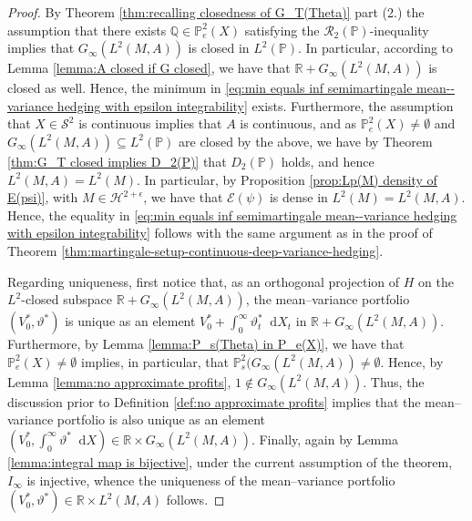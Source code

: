 \documentclass[11pt,a4paper,twoside,openany]{report}
\numberwithin{equation}{section}
\newcommand{\diff}{\mathop{}\!\mathrm{d}}
\theoremstyle{plain} %
\theoremstyle{definition} %
\theoremstyle{remark} %
\begin{document}
\begin{proof}
   By Theorem \ref{thm:recalling closedness of G_T(Theta)} part (2.) the assumption that there exists \(\mathbb{Q}\in\mathbb{P}_e^2(X)\) satisfying the \(\mathcal{R}_2(\mathbb{P})\)-inequality implies that \(G_{\infty}(L^2(M,A))\) is closed in \(L^2(\mathbb{P})\). In particular, according to Lemma \ref{lemma:A closed if G closed}, we have that \(\mathbb{R}+G_{\infty}(L^2(M,A))\) is closed as well. Hence, the minimum in \eqref{eq:min equals inf semimartingale mean--variance hedging with epsilon integrability} exists. 
  Furthermore, the assumption that \(X\in \mathcal{S}^2\) is continuous implies that \(A\) is continuous, and as \(\mathbb{P}_e^2(X)\neq\emptyset\) and \(G_{\infty}(L^2(M,A))\subseteq L^2(\mathbb{P})\) are closed by the above, we have by Theorem \ref{thm:G_T closed implies D_2(P)} that \(D_2(\mathbb{P})\) holds, and hence \(L^2(M,A) = L^2(M)\). In particular, by Proposition \ref{prop:Lp(M) density of E(psi)}, with \(M\in\mathcal{H}^{2+\epsilon}\), we have that \(\mathcal{E}(\psi)\) is dense in \(L^2(M)=L^2(M,A)\). Hence, the equality in \eqref{eq:min equals inf semimartingale mean--variance hedging with epsilon integrability} follows with the same argument as in the proof of Theorem \ref{thm:martingale-setup-continuous-deep-variance-hedging}.

   Regarding uniqueness, first notice that, as an orthogonal projection of \(H\) on the \(L^2\)-closed subspace \(\mathbb{R}+G_{\infty}(L^2(M,A))\), the mean--variance portfolio \((V_0^*,\vartheta^*)\) is unique as an element \(V_0^*+\int_0^\infty\vartheta_t^*\diff X_t\) in \(\mathbb{R}+G_{\infty}(L^2(M,A))\). Furthermore, by Lemma \ref{lemma:P_s(Theta) in P_e(X)}, we have that \(\mathbb{P}_e^2(X)\neq \emptyset\) implies, in particular, that \(\mathbb{P}_s^2(G_{\infty}(L^2(M,A))\neq \emptyset\). Hence, by Lemma \ref{lemma:no approximate profits}, \(1\notin G_{\infty}(L^2(M,A))\). Thus, the discussion prior to Definition \ref{def:no approximate profits} implies that the mean--variance portfolio is also unique as an element  \((V_0^*,\int_0^\infty\vartheta^*\diff X)\in\mathbb{R}\times G_{\infty}(L^2(M,A))\). Finally, again by Lemma \ref{lemma:integral map is bijective}, under the current assumption of the theorem, \(I_{\infty}\) is injective, whence the uniqueness of the mean--variance portfolio \((V_0^*,\vartheta^*)\in\mathbb{R}\times L^2(M,A)\) follows.
\end{proof}
\end{document}
